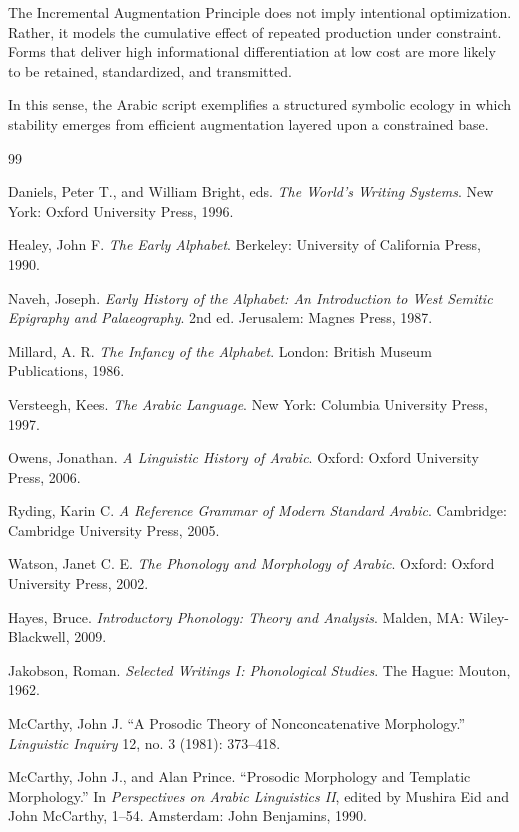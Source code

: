 \documentclass[11pt]{article}
\begin{document}
The Incremental Augmentation Principle does not imply intentional optimization. Rather, it models the cumulative effect of repeated production under constraint. Forms that deliver high informational differentiation at low cost are more likely to be retained, standardized, and transmitted.

In this sense, the Arabic script exemplifies a structured symbolic ecology in which stability emerges from efficient augmentation layered upon a constrained base.

\newpage
\begin{thebibliography}{99}

Daniels, Peter T., and William Bright, eds. \textit{The World's Writing Systems}. New York: Oxford University Press, 1996.

Healey, John F. \textit{The Early Alphabet}. Berkeley: University of California Press, 1990.

Naveh, Joseph. \textit{Early History of the Alphabet: An Introduction to West Semitic Epigraphy and Palaeography}. 2nd ed. Jerusalem: Magnes Press, 1987.

Millard, A. R. \textit{The Infancy of the Alphabet}. London: British Museum Publications, 1986.

Versteegh, Kees. \textit{The Arabic Language}. New York: Columbia University Press, 1997.

Owens, Jonathan. \textit{A Linguistic History of Arabic}. Oxford: Oxford University Press, 2006.

Ryding, Karin C. \textit{A Reference Grammar of Modern Standard Arabic}. Cambridge: Cambridge University Press, 2005.

Watson, Janet C. E. \textit{The Phonology and Morphology of Arabic}. Oxford: Oxford University Press, 2002.

Hayes, Bruce. \textit{Introductory Phonology: Theory and Analysis}. Malden, MA: Wiley-Blackwell, 2009.

Jakobson, Roman. \textit{Selected Writings I: Phonological Studies}. The Hague: Mouton, 1962.

McCarthy, John J. “A Prosodic Theory of Nonconcatenative Morphology.” \textit{Linguistic Inquiry} 12, no. 3 (1981): 373–418.

McCarthy, John J., and Alan Prince. “Prosodic Morphology and Templatic Morphology.” In \textit{Perspectives on Arabic Linguistics II}, edited by Mushira Eid and John McCarthy, 1–54. Amsterdam: John Benjamins, 1990.


\end{thebibliography}
\end{document}
